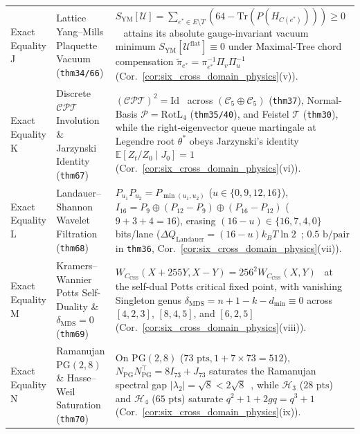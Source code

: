 \documentclass[11pt,letterpaper]{article}
\theoremstyle{spectralthm}
\begin{document}
\begin{table}[!htp]
{\begin{minipage}{1.14\textwidth}
\begin{tabularx}{\textwidth}{@{}>{\bfseries\raggedright\arraybackslash}p{2.05cm} >{\raggedright\arraybackslash}p{3.40cm} >{\raggedright\arraybackslash}X@{}}
\addlinespace[1.2pt]
Exact Equality J & Lattice Yang--Mills Plaquette Vacuum (\texttt{thm34/66}) & $S_{\mathrm{YM}}[\mathcal{U}] = \sum_{e^*\in E\setminus T}(64 - \mathrm{Tr}(P(H_{C(e^*)}))) \ge 0$~\cite{wilson1974confinement, kogut1975hamiltonian} attains its absolute gauge-invariant vacuum minimum $S_{\mathrm{YM}}[\mathcal{U}^{\mathrm{flat}}] \equiv 0$ under Maximal-Tree chord compensation $\widetilde{\pi}_{e^*} = \pi_{e^*}^{-1}\Pi_v\Pi_u^{-1}$ (Cor.~\ref{cor:six_cross_domain_physics}(v)). \\
\addlinespace[1.2pt]
Exact Equality K & Discrete $\mathcal{CPT}$ Involution \& Jarzynski Identity (\texttt{thm67}) & $(\mathcal{C}\mathcal{P}\mathcal{T})^2 = \mathrm{Id}$~\cite{luders1954proof} across $(\mathcal{C}_5\oplus\mathcal{C}_5)$ (\texttt{thm37}), Normal-Basis $\mathcal{P} = \mathrm{RotL}_4$ (\texttt{thm35/40}), and Feistel $\mathcal{T}$ (\texttt{thm30}), while the right-eigenvector queue martingale at Legendre root $\theta^*$ obeys Jarzynski's identity~\cite{jarzynski1997nonequilibrium} $\mathbb{E}[Z_t/Z_0\mid J_0] = 1$ (Cor.~\ref{cor:six_cross_domain_physics}(vi)). \\
\addlinespace[1.2pt]
Exact Equality L & Landauer--Shannon Wavelet Filtration (\texttt{thm68}) & $P_{u_1}P_{u_2} = P_{\min(u_1,u_2)}$ ($u\in\{0,9,12,16\}$), $I_{16} = P_9 \oplus (P_{12}-P_9) \oplus (P_{16}-P_{12})$ ($9+3+4=16$), erasing $(16-u)\in\{16,7,4,0\}$ bits/lane ($\Delta Q_{\mathrm{Landauer}}=(16-u)k_B T\ln 2$~\cite{1}; $0.5\text{~b/pair}$ in \texttt{thm36}, Cor.~\ref{cor:six_cross_domain_physics}(vii)). \\
\addlinespace[1.2pt]
Exact Equality M & Kramers--Wannier Potts Self-Duality \& $\delta_{\mathrm{MDS}}=0$ (\texttt{thm69}) & $W_{C_{\mathrm{CSS}}}(X+255Y, X-Y) = 256^2 W_{C_{\mathrm{CSS}}}(X,Y)$~\cite{kramers1941statistics, greene1976weight} at the self-dual Potts critical fixed point, with vanishing Singleton genus $\delta_{\mathrm{MDS}} = n+1-k-d_{\min} \equiv 0$ across $[4,2,3]$, $[8,4,5]$, and $[6,2,5]$ (Cor.~\ref{cor:six_cross_domain_physics}(viii)). \\
\addlinespace[1.2pt]
Exact Equality N & Ramanujan $\mathrm{PG}(2,8)$ \& Hasse--Weil Saturation (\texttt{thm70}) & On $\mathrm{PG}(2,8)$ ($73\text{~pts}, 1+7\times 73=512$), $N_{\mathrm{PG}}N_{\mathrm{PG}}^\top = 8I_{73}+J_{73}$ saturates the Ramanujan spectral gap $|\lambda_2|=\sqrt{8}<2\sqrt{8}$~\cite{lubotzky1988ramanujan}, while $\mathcal{H}_3$ ($28\text{~pts}$) and $\mathcal{H}_4$ ($65\text{~pts}$) saturate $q^2+1+2gq = q^3+1$~\cite{weil1948courbes} (Cor.~\ref{cor:six_cross_domain_physics}(ix)). \\

\end{tabularx}
\end{minipage}}
\end{table}
\end{document}
